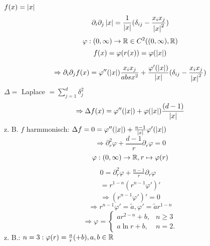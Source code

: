 \documentclass[../ana2.tex]{subfiles}
\begin{document}
\( f(x) = \left|x\right| \)
\[ \partial_i \partial_j \left|x\right| 
= \frac{1}{\left|x\right|} (\delta_{ij} - \frac{x_i x_j}{\left|x\right|^2}) \]
\[ \varphi:(0,\infty)\rightarrow \mathbb{R} \in C^2((0,\infty), \mathbb{R}) \]
\[ f(x) = \varphi(r(x)) = \varphi(\left|x\right|) \]


\[ \Rightarrow \partial_i \partial_j f(x) 
= \varphi''(\left|x\right|) \frac{x_i x_j}{abs{x}^2}
+ \frac{\varphi'(\left|x\right|)}{\left|x\right|} (\delta_{ij} 
- \frac{x_i x_j}{\left|x\right|^2}) \]
\( \Delta = \) Laplace \( = \sum_{j=1}^d \delta_j^2 \)
\[ \Rightarrow \Delta f(x) 
= \varphi''(\left|x\right|) + \varphi(\left|x\right|) 
\frac{(d-1)}{\left|x\right|} \]
z. B. \( f \) harmmonisch: \( \Delta f = 0
= \varphi''(\left|x\right|) + \frac{n-1}{\left|x\right|} \varphi'(\left|x\right|) \)
\[ \Rightarrow \partial_r^2 \varphi + \frac{d-1}{r} \partial_r \varphi = 0 \]
\[ \varphi:(0,\infty)\rightarrow \mathbb{R}, r \mapsto \varphi(r) \]
\begin{align*}
    0 = \partial_r^2 \varphi + \frac{n-1}{r} \partial_r \varphi \\
    = r^{1-n} ( r^{n-1}\varphi')'
\end{align*}
\[ \Rightarrow (r^{n-1}\varphi')' = 0 \]
\[ \Rightarrow r^{n-1} \varphi' = \tilde{a}, 
\varphi' = \tilde{a} r^{1-n} \]
\[ \Rightarrow \varphi =
\begin{cases}
    a r^{2-n} + b, &n \geq 3\\
    a \ln r + b, & n = 2.
\end{cases} \]
z. B.: \( n=3: \varphi(r) = \frac{a}{r} (+b), a,b\in \mathbb{R} \)
\end{document}

